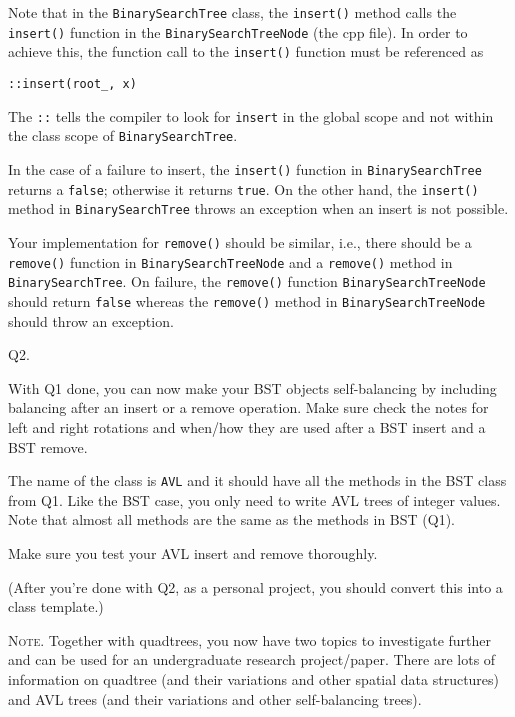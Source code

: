 Note that in the \verb!BinarySearchTree! class, the \verb!insert()!
method calls the \verb!insert()! function in the 
\verb!BinarySearchTreeNode! (the cpp file). 
In order to achieve this, the function call to the \verb!insert()!
function must be referenced as
\begin{Verbatim}
::insert(root_, x)
\end{Verbatim}
The \verb!::! tells the compiler to look for \verb!insert! in the 
global scope and not within the class scope of \verb!BinarySearchTree!.

In the case of a failure to insert, the \verb!insert()! function
in \verb!BinarySearchTree!
returns a \verb!false!; otherwise it returns \verb!true!.
On the other hand, the \verb!insert()! method in \verb!BinarySearchTree!
throws an exception when an insert is not possible.

Your implementation for \verb!remove()! should be similar, i.e.,
there should be a \verb!remove()! function in \verb!BinarySearchTreeNode!
and a \verb!remove()! method in \verb!BinarySearchTree!.
On failure, 
the \verb!remove()! function \verb!BinarySearchTreeNode! 
should return \verb!false! whereas the \verb!remove()! method in 
\verb!BinarySearchTreeNode! should throw an exception.


\newpage
Q2.

With Q1 done, you can now make your BST objects self-balancing by including
balancing after an insert or a remove operation.
Make sure check the notes for left and right rotations and when/how
they are used after a BST insert and a BST remove.

The name of the class is \verb!AVL! and it should have all the
methods in the BST class from Q1.
Like the BST case, you only need to write AVL trees of integer values.
Note that almost all methods are the same as the methods in BST (Q1).

Make sure you test your AVL insert and remove thoroughly.

(After you're done with Q2, as a personal project, you should convert this into
a class template.)


\textsc{Note.}
Together with quadtrees, you now have two topics to investigate
further and can be used for an undergraduate research project/paper.
There are lots of information on quadtree (and their variations and other
spatial data structures)
and AVL trees (and their variations and other self-balancing trees).


